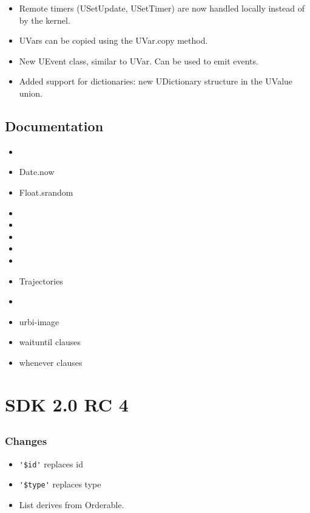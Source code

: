 \begin{itemize}
\item Remote timers (USetUpdate, USetTimer) are now handled locally
  instead of by the kernel.
\item UVars can be copied using the UVar.copy method.
\item New UEvent class, similar to UVar. Can be used to emit events.
\item Added support for dictionaries: new UDictionary structure in the
  UValue union.
\end{itemize}

\subsection{Documentation}

\begin{itemize}
\item {}
\item Date.now
\item Float.srandom
\item {}
\item {}
\item {}
\item {}
\item {}
\item Trajectories
\item {}
\item urbi-image
\item waituntil clauses
\item whenever clauses
\end{itemize}

\section{\urbi SDK 2.0 RC 4}

\subsection{\us}
\subsubsection{Changes}

\begin{itemize}
\item \lstinline|'$id'| replaces id
\item \lstinline|'$type'| replaces type
\item List derives from Orderable.
\end{itemize}

